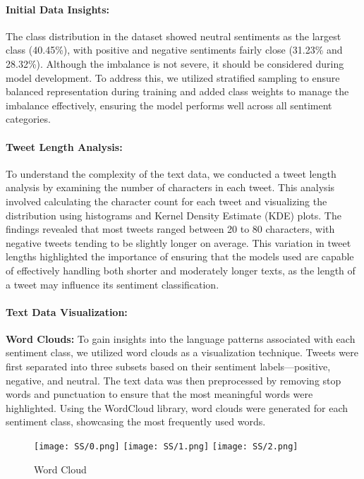 \documentclass[journal]{IEEEtran}
\begin{document}
\paragraph{\textbf{Initial Data Insights:}}
The class distribution in the dataset showed neutral sentiments as the largest class (40.45\%), with positive and negative sentiments fairly close (31.23\% and 28.32\%). Although the imbalance is not severe, it should be considered during model development. To address this, we utilized stratified sampling to ensure balanced representation during training and added class weights to manage the imbalance effectively, ensuring the model performs well across all sentiment categories.

\paragraph{\textbf{Tweet Length Analysis:}}
To understand the complexity of the text data, we conducted a tweet length analysis by examining the number of characters in each tweet. This analysis involved calculating the character count for each tweet and visualizing the distribution using histograms and Kernel Density Estimate (KDE) plots. The findings revealed that most tweets ranged between 20 to 80 characters, with negative tweets tending to be slightly longer on average. This variation in tweet lengths highlighted the importance of ensuring that the models used are capable of effectively handling both shorter and moderately longer texts, as the length of a tweet may influence its sentiment classification.

\paragraph{\textbf{Text Data Visualization:}}
\textbf{Word Clouds:} To gain insights into the language patterns associated with each sentiment class, we utilized word clouds as a visualization technique. Tweets were first separated into three subsets based on their sentiment labels—positive, negative, and neutral. The text data was then preprocessed by removing stop words and punctuation to ensure that the most meaningful words were highlighted. Using the WordCloud library, word clouds were generated for each sentiment class, showcasing the most frequently used words.

\begin{figure}[H]
\centering
\texttt{[image: SS/0.png]}
\texttt{[image: SS/1.png]}
\texttt{[image: SS/2.png]}
\caption{Word Cloud  }
\end{figure}
\end{document}
